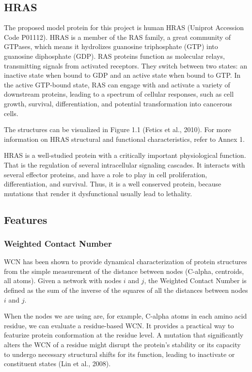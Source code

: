 \documentclass{article}
\begin{document}
\subsection{HRAS}

The proposed model protein for this project is human HRAS (Uniprot Accession Code P01112). HRAS is a member of the RAS family, a great community of GTPases, which means it hydrolizes guanosine triphosphate (GTP) into guanosine diphosphate (GDP). RAS proteins function as molecular relays, transmitting signals from activated receptors. They switch between two states: an inactive state when bound to GDP and an active state when bound to GTP. In the active GTP-bound state, RAS can engage with and activate a variety of downstream proteins, leading to a spectrum of cellular responses, such as cell growth, survival, differentiation, and potential transformation into cancerous cells.

The structures can be visualized in Figure 1.1 (Fetics et al., 2010). For more information on HRAS structural and functional characteristics, refer to Annex 1.

HRAS is a well-studied protein with a critically important physiological function. That is the regulation of several intracellular signaling cascades. It interacts with several effector proteins, and have a role to play in cell proliferation, differentiation, and survival. Thus, it is a well conserved protein, because mutations that render it dysfunctional usually lead to lethality.

\subsection{Features}

\subsubsection{Weighted Contact Number}

WCN has been shown to provide dynamical characterization of protein structures from the simple measurement of the distance between nodes (C-alpha, centroids, all atoms). Given a network with nodes \(i\) and \(j\), the Weighted Contact Number is defined as the sum of the inverse of the squares of all the distances between nodes \(i\) and \(j\).

When the nodes we are using are, for example, C-alpha atoms in each amino acid residue, we can evaluate a residue-based WCN. It provides a practical way to featurize protein conformation at the residue level. A mutation that significantly alters the WCN of a residue might disrupt the protein’s stability or its capacity to undergo necessary structural shifts for its function, leading to inactivate or constituent states (Lin et al., 2008).
\end{document}
